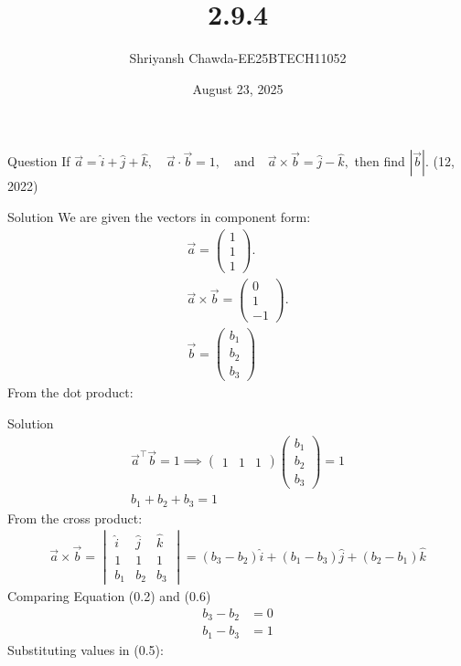 \documentclass{beamer}
\title{2.9.4}
\author{Shriyansh Chawda-EE25BTECH11052}
\date{August 23, 2025}
\newcommand{\myvec}[1]{\ensuremath{\begin{pmatrix}#1\end{pmatrix}}}
\providecommand{\brak}[1]{\ensuremath{\left(#1\right)}}
\begin{document}
	

		\frame{\titlepage}
	
	
	

	\begin{frame}{Question} 
If   $\vec{a} = \hat{i} + \hat{j} + \hat{k}, \quad \vec{a} \cdot \vec{b} = 1, \quad \text{and} \quad \vec{a} \times \vec{b} = \hat{j} - \hat{k},$ then find \textbf{$|\vec{b}|$}.
\hfill (12, 2022)
	\end{frame}
	
\begin{frame}{Solution}
	We are given the vectors in component form:
\begin{align}
	\vec{a} = \myvec{1 \\ 1 \\ 1}.\\
	\vec{a} \times \vec{b} = \myvec{0 \\ 1 \\ -1}.\\
	\vec{b} = \myvec{b_1 \\ b_2 \\ b_3}
\end{align}
From the dot product: \\

\end{frame}

\begin{frame}{Solution}
	\begin{align}
		\vec{a}^\top \vec{b} = 1 \implies
		\begin{pmatrix} 1 & 1 & 1 \end{pmatrix} \myvec{b_1 \\ b_2 \\ b_3} = 1\\
		b_1 + b_2 + b_3 = 1 
	\end{align}
	From the cross product: \\
	
\begin{align}     
	\vec{a} \times \vec{b} = \begin{vmatrix} \hat{i} & \hat{j} & \hat{k} \\ 1 & 1 & 1 \\ b_1 & b_2 & b_3 \end{vmatrix} = \brak{b_3 - b_2}\hat{i} + \brak{b_1 - b_3}\hat{j} + \brak{b_2 - b_1}\hat{k}
\end{align}
Comparing Equation (0.2) and (0.6)
\begin{align}
	b_3 - b_2 &= 0   \\
	b_1 - b_3 &= 1 
\end{align}
Substituting values in (0.5):


\end{frame}
\end{document}
